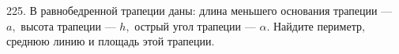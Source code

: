 225. В равнобедренной трапеции даны: длина меньшего основания трапеции --- $a,$ высота трапеции --- $h,$ острый угол трапеции --- $\alpha.$ Найдите периметр, среднюю линию и площадь этой трапеции.\\
